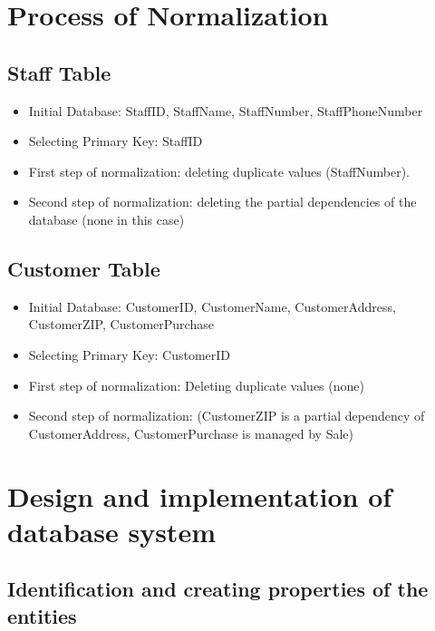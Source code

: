 \documentclass[11pt]{article}
\author{viet}
\date{\today}
\title{}
\begin{document}
\tableofcontents

\section{Process of Normalization}
\label{sec:orgd0e9247}
\subsection{Staff Table}
\label{sec:org5517330}
\begin{itemize}
\item Initial Database: StaffID, StaffName, StaffNumber, StaffPhoneNumber
\item Selecting Primary Key: StaffID
\item First step of normalization: deleting duplicate values (StaffNumber).
\item Second step of normalization: deleting the partial dependencies of the database (none in this case)
\end{itemize}
\subsection{Customer Table}
\label{sec:orgd2a3769}
\begin{itemize}
\item Initial Database: CustomerID, CustomerName, CustomerAddress, CustomerZIP, CustomerPurchase
\item Selecting Primary Key: CustomerID
\item First step of normalization: Deleting duplicate values (none)
\item Second step of normalization: (CustomerZIP is a partial dependency of CustomerAddress, CustomerPurchase is managed by Sale)
\end{itemize}
\section{Design and implementation of database system}
\label{sec:org0ac814c}
\subsection{Identification and creating properties of the entities}
\label{sec:orgd2818ba}
\end{document}

